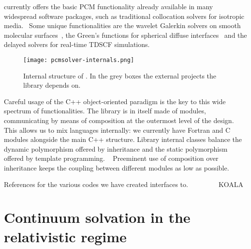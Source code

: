 \pcmsolver currently offers the basic PCM functionality already
available in many widespread software packages, such as traditional
collocation solvers for isotropic media.~\autocite{Tomasi2005-vm}
Some unique functionalities are the wavelet Galerkin solvers on smooth
molecular surfaces~\autocite{Weijo2010-hy, Bugeanu2015-tp}, the Green’s
functions for spherical diffuse interfaces~\autocite{DiRemigio2016-nn} and
the delayed solvers for real-time \acl{TDSCF}
simulations.~\autocite{Corni2015-pe}

\begin{figure}[tb]
  \centering
  \texttt{[image: pcmsolver-internals.png]}
  \caption[Internal structure of \pcmsolver.]
  {
  Internal structure of \pcmsolver. In the grey boxes the external
  projects the library depends on.
  }
\end{figure}

Careful usage of the C++ object-oriented paradigm is the key to this
wide spectrum of functionalities. The library is in itself made of
modules, communicating by means of composition at the outermost
level of the design.
This allows us to mix languages internally: we currently have Fortran
and C modules alongside the main C++ structure.
Library internal classes balance the dynamic polymorphism offered by
inheritance and the static polymorphism offered by template programming.
~\autocite{Alexandrescu2001-bp, Sutter2004-nt, Langr2012-js}
Preeminent use of composition over inheritance keeps the coupling
between different modules as low as possible.~\autocite{Gamma1995-fd}

References for the various codes we have created interfaces to.
\psicode~\autocite{Turney2012-de}
\DIRAC~\autocite{DIRAC15}
\DALTON~\autocite{DALTON16, Aidas2013-rp}
\LSDALTON~\autocite{LSDALTON16, Aidas2013-rp}
\ReSpect~\autocite{ReSpect-3.5.0, OtherStuff}
KOALA~\autocite{Hofener2014-ex, Hofener2016-qz}

\section{Continuum solvation in the relativistic regime}\label{sec:relapcm}

